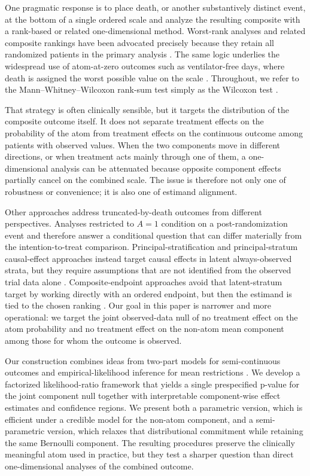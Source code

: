 \documentclass[11pt]{article}
\begin{document}
One pragmatic response is to place death, or another substantively distinct event, at the bottom of a single ordered scale and analyze the resulting composite with a rank-based or related one-dimensional method. Worst-rank analyses and related composite rankings have been advocated precisely because they retain all randomized patients in the primary analysis \citep{Lachin_1999,McMahon_2000,Colantuoni_2018}. The same logic underlies the widespread use of atom-at-zero outcomes such as ventilator-free days, where death is assigned the worst possible value on the scale \citep{Yehya_2019}. Throughout, we refer to the Mann--Whitney--Wilcoxon rank-sum test simply as the Wilcoxon test \citep{wilcoxon3001968individual,mann1947test}.

That strategy is often clinically sensible, but it targets the distribution of the composite outcome itself. It does not separate treatment effects on the probability of the atom from treatment effects on the continuous outcome among patients with observed values. When the two components move in different directions, or when treatment acts mainly through one of them, a one-dimensional analysis can be attenuated because opposite component effects partially cancel on the combined scale. The issue is therefore not only one of robustness or convenience; it is also one of estimand alignment.

Other approaches address truncated-by-death outcomes from different perspectives. Analyses restricted to $A=1$ condition on a post-randomization event and therefore answer a conditional question that can differ materially from the intention-to-treat comparison. Principal-stratification and principal-stratum causal-effect approaches instead target causal effects in latent always-observed strata, but they require assumptions that are not identified from the observed trial data alone \citep{Frangakis_2002,Colantuoni_2018}. Composite-endpoint approaches avoid that latent-stratum target by working directly with an ordered endpoint, but then the estimand is tied to the chosen ranking \citep{McMahon_2000,Colantuoni_2018}. Our goal in this paper is narrower and more operational: we target the joint observed-data null of no treatment effect on the atom probability and no treatment effect on the non-atom mean component among those for whom the outcome is observed.

Our construction combines ideas from two-part models for semi-continuous outcomes \citep{aitchison1955distribution,cragg1971some} and empirical-likelihood inference for mean restrictions \citep{owen1988empirical,owen1991empirical,kitamura2001asymptotic}. We develop a factorized likelihood-ratio framework that yields a single prespecified p-value for the joint component null together with interpretable component-wise effect estimates and confidence regions. We present both a parametric version, which is efficient under a credible model for the non-atom component, and a semi-parametric version, which relaxes that distributional commitment while retaining the same Bernoulli component. The resulting procedures preserve the clinically meaningful atom used in practice, but they test a sharper question than direct one-dimensional analyses of the combined outcome.
\end{document}
